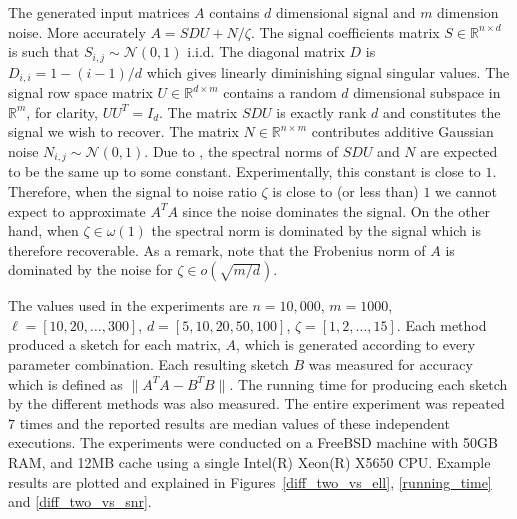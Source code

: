 \documentclass[]{article}
\newcommand{\R}{{\mathbb R}}
\newcommand{\N}{{\mathcal N}}
\begin{document}
The generated input matrices $A$ contains $d$ dimensional signal and $m$ dimension noise. 
More accurately $A = S D U + N/\zeta$.
The signal coefficients matrix $S \in  \R^{n \times d}$ is such that $S_{i,j} \sim \N(0,1)$ i.i.d.
The diagonal matrix $D$ is $D_{i,i} = 1- (i-1)/d$ which gives linearly diminishing signal singular values. 
The signal row space matrix $U \in \R^{d \times m}$ contains a random $d$ dimensional subspace in $\R^{m}$, for clarity, $UU^{T} = I_{d}$.
The matrix $S D U$ is exactly rank $d$ and constitutes the signal we wish to recover. 
The matrix $N \in \R^{n \times m}$ contributes additive Gaussian noise $N_{i,j} \sim \N(0,1)$. 
Due to \cite{Vershynin08prodOfRandMatrices}, the spectral norms of $S D U$ and $N$ are expected to be the same up to some constant.
Experimentally, this constant is close to $1$.
Therefore, when the signal to noise ratio $\zeta$ is close to (or less than) $1$ we cannot expect to approximate $A^{T}A$ since the noise dominates the signal.
On the other hand, when $\zeta \in \omega(1)$ the spectral norm is dominated by the signal which is therefore recoverable.
As a remark, note that the Frobenius norm of $A$ is dominated by the noise for $\zeta \in o(\sqrt{m/d})$.

The values used in the experiments are $n = 10,000$, $m=1000$, $\ell=[10,20,\ldots,300]$, $d = [5,10,20,50,100]$, $\zeta = [1,2,\ldots,15]$.
Each method produced a sketch for each matrix, $A$, which is generated according to every parameter combination.
Each resulting sketch $B$ was measured for accuracy which is defined as $\|A^{T}A - B^{T}B\|$.
The running time for producing each sketch by the different methods was also measured.
The entire experiment was repeated $7$ times and the reported results are median values of these independent executions.
The experiments were conducted on a FreeBSD machine with 50GB RAM, and 12MB cache using a single Intel(R) Xeon(R) X5650 CPU.  
Example results are plotted and explained in Figures~\ref{diff_two_vs_ell}, \ref{running_time} and  \ref{diff_two_vs_snr}.
\end{document}
